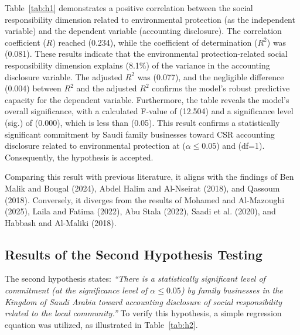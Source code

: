 \documentclass[10pt]{NSP1}
\begin{document}
	Table~\ref{tab:h1} demonstrates a positive correlation between the social responsibility dimension related to environmental protection (as the independent variable) and the dependent variable (accounting disclosure). The correlation coefficient (\(R\)) reached (0.234), while the coefficient of determination (\(R^2\)) was (0.081). These results indicate that the environmental protection-related social responsibility dimension explains (8.1\%) of the variance in the accounting disclosure variable. The adjusted \(R^2\) was (0.077), and the negligible difference (0.004) between \(R^2\) and the adjusted \(R^2\) confirms the model's robust predictive capacity for the dependent variable. Furthermore, the table reveals the model's overall significance, with a calculated F-value of (12.504) and a significance level (sig.) of (0.000), which is less than (0.05). This result confirms a statistically significant commitment by Saudi family businesses toward CSR accounting disclosure related to environmental protection at (\(\alpha \leq 0.05\)) and (df=1). Consequently, the hypothesis is accepted.
	
	Comparing this result with previous literature, it aligns with the findings of Ben Malik and Bougal (2024), Abdel Halim and Al-Nseirat (2018), and Qassoum (2018). Conversely, it diverges from the results of Mohamed and Al-Mazoughi (2025), Laila and Fatima (2022), Abu Stala (2022), Saadi et al. (2020), and Habbash and Al-Maliki (2018).
	
	\subsection{Results of the Second Hypothesis Testing}
	
	The second hypothesis states: \emph{``There is a statistically significant level of commitment (at the significance level of \(\alpha \leq 0.05\)) by family businesses in the Kingdom of Saudi Arabia toward accounting disclosure of social responsibility related to the local community.''} To verify this hypothesis, a simple regression equation was utilized, as illustrated in Table~\ref{tab:h2}.
	
\end{document}
